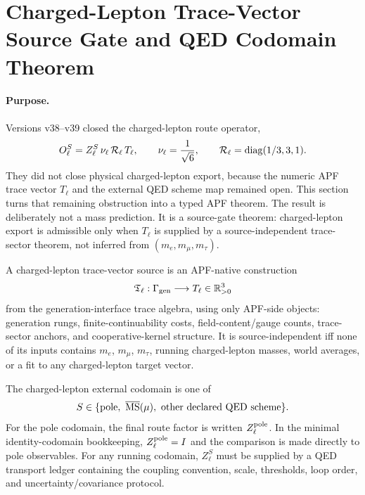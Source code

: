 \section{Charged-Lepton Trace-Vector Source Gate and QED Codomain Theorem}\label{sec:charged-lepton-trace-vector-source-gate-v40}

\paragraph{Purpose.}
Versions v38--v39 closed the charged-lepton route operator,
\[
  O_\ell^S=Z_\ell^S\,\nu_\ell\,\mathcal R_\ell\,T_\ell,
  \qquad
  \nu_\ell={1\over\sqrt6},
  \qquad
  \mathcal R_\ell=\operatorname{diag}(1/3,3,1).
\]
They did not close physical charged-lepton export, because the numeric APF trace vector
\(T_\ell\) and the external QED scheme map remained open.  This section turns that
remaining obstruction into a typed APF theorem.  The result is deliberately not a mass
prediction.  It is a source-gate theorem: charged-lepton export is admissible only when
\(T_\ell\) is supplied by a source-independent trace-sector theorem, not inferred from
\((m_e,m_\mu,m_\tau)\).

\begin{definition}\label{def:charged-lepton-trace-vector-source-v40}
A charged-lepton trace-vector source is an APF-native construction
\[
   \mathfrak T_\ell:\Gamma_{\rm gen}\longrightarrow T_\ell\in\mathbb R_{>0}^3
\]
from the generation-interface trace algebra, using only APF-side objects: generation
rungs, finite-continuability costs, field-content/gauge counts, trace-sector anchors, and
cooperative-kernel structure.  It is source-independent iff none of its inputs contains
\(m_e\), \(m_\mu\), \(m_\tau\), running charged-lepton masses, world averages, or a fit to
any charged-lepton target vector.
\end{definition}

\begin{definition}\label{def:qed-charged-lepton-codomain-v40}
The charged-lepton external codomain is one of
\[
   S\in\{\text{pole},\ \overline{\rm MS}(\mu),\ \text{other declared QED scheme}\}.
\]
For the pole codomain, the final route factor is written \(Z_\ell^{\rm pole}\).  In the
minimal identity-codomain bookkeeping, \(Z_\ell^{\rm pole}=I\) and the comparison is made
directly to pole observables.  For any running codomain, \(Z_\ell^S\) must be supplied by a
QED transport ledger containing the coupling convention, scale, thresholds, loop order,
and uncertainty/covariance protocol.
\end{definition}

